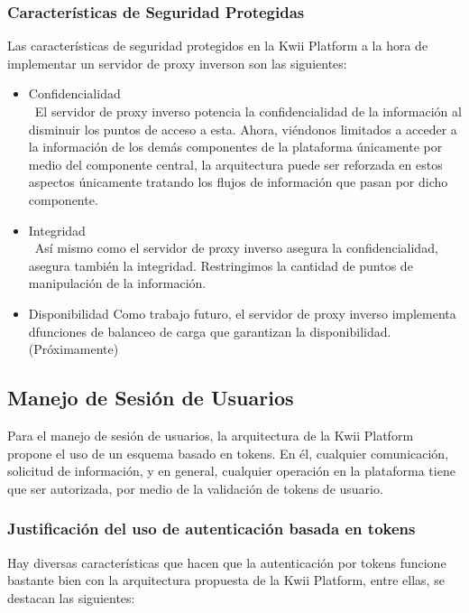 \subsubsection{Características de Seguridad Protegidas}
Las características de seguridad protegidos en la Kwii Platform a la hora de implementar un servidor de proxy inverson son las siguientes:
\begin{itemize}
    \item Confidencialidad\\\
    El servidor de proxy inverso potencia la confidencialidad de la información al disminuir los puntos de acceso a esta. Ahora, viéndonos limitados a acceder a la información de los demás componentes de la plataforma únicamente por medio del componente central, la arquitectura puede ser reforzada en estos aspectos únicamente tratando los flujos de información que pasan por dicho componente.
    \item Integridad\\\
    Así mismo como el servidor de proxy inverso asegura la confidencialidad, asegura también la integridad. Restringimos la cantidad de puntos de manipulación de la información.
    \item Disponibilidad
    Como trabajo futuro, el servidor de proxy inverso implementa dfunciones de balanceo de carga que garantizan la disponibilidad. (Próximamente)
\end{itemize}

\subsection{Manejo de Sesión de Usuarios}

Para el manejo de sesión de usuarios, la arquitectura de la Kwii Platform propone el uso de un esquema basado en tokens. En él, cualquier comunicación, solicitud de información, y en general, cualquier operación en la plataforma tiene que ser autorizada, por medio de la validación de tokens de usuario.

\subsubsection{Justificación del uso de autenticación basada en tokens}

Hay diversas características que hacen que la autenticación por tokens funcione bastante bien con la arquitectura propuesta de la Kwii Platform, entre ellas, se destacan las siguientes:

